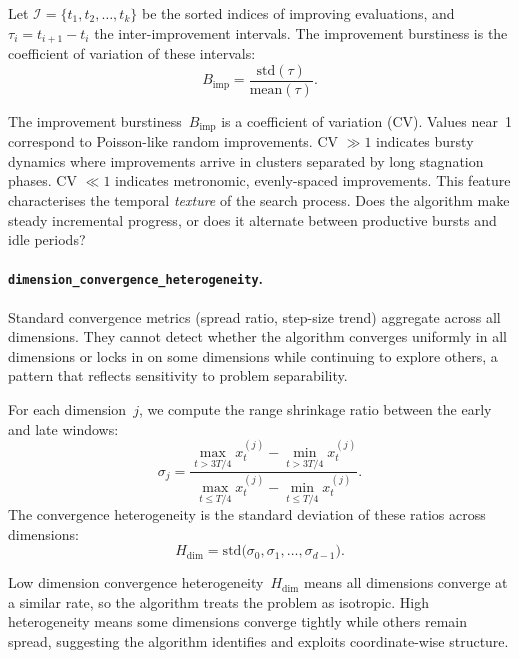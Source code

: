 Let $\mathcal{I} = \{t_1, t_2, \ldots, t_k\}$ be the sorted indices of
improving evaluations, and $\tau_i = t_{i+1} - t_i$ the inter-improvement
intervals.  The improvement burstiness is the coefficient of variation of these
intervals:
\begin{equation}
\label{eq:burst}
  B_{\mathrm{imp}}
    = \frac{\mathrm{std}(\tau)}{\mathrm{mean}(\tau)}.
\end{equation}

The improvement burstiness~$B_{\mathrm{imp}}$ is a coefficient of
variation (CV).  Values near~1 correspond to Poisson-like random
improvements.  CV $\gg 1$ indicates bursty dynamics where improvements arrive
in clusters separated by long stagnation phases.  CV $\ll 1$ indicates
metronomic, evenly-spaced improvements.  This feature characterises the
temporal \emph{texture} of the search process. Does the algorithm make steady
incremental progress, or does it alternate between productive bursts and idle
periods?

\paragraph{\texttt{dimension\_convergence\_heterogeneity}.}
\label{sec:features:novel:dimhet}

Standard convergence metrics (spread ratio, step-size trend) aggregate across
all dimensions.  They cannot detect whether the algorithm converges uniformly
in all dimensions or locks in on some dimensions while continuing to explore
others, a pattern that reflects sensitivity to problem separability.

For each dimension~$j$, we compute the range shrinkage ratio between the early
and late windows:
\begin{equation}
\label{eq:shrinkage}
  \sigma_j
    = \frac{\max_{t > 3T/4} x_t^{(j)} - \min_{t > 3T/4} x_t^{(j)}}
           {\max_{t \le T/4} x_t^{(j)} - \min_{t \le T/4} x_t^{(j)}}.
\end{equation}
The convergence heterogeneity is the standard deviation of these ratios across
dimensions:
\begin{equation}
\label{eq:dimhet}
  H_{\mathrm{dim}}
    = \mathrm{std}\!\bigl(\sigma_0, \sigma_1,
      \ldots, \sigma_{d-1}\bigr).
\end{equation}

Low dimension convergence heterogeneity~$H_{\mathrm{dim}}$ means all
dimensions converge at a similar rate, so the
algorithm treats the problem as isotropic.  High heterogeneity means some
dimensions converge tightly while others remain spread, suggesting the algorithm
identifies and exploits coordinate-wise structure.

